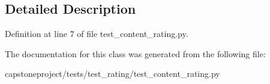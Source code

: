 \subsection{Detailed Description}


Definition at line 7 of file test\+\_\+content\+\_\+rating.\+py.



The documentation for this class was generated from the following file\+:\begin{DoxyCompactItemize}
\item 
capstoneproject/tests/test\+\_\+rating/test\+\_\+content\+\_\+rating.\+py\end{DoxyCompactItemize}
